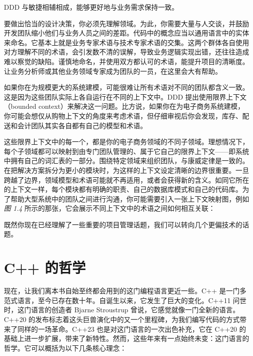 DDD 与敏捷相辅相成，能够更好地与业务需求保持一致。

要做出恰当的设计决策，你必须先理解领域。为此，你需要大量与人交谈，并鼓励开发团队缩小他们与业务人员之间的差距。代码中的概念应当以通用语言中的实体来命名。它基本上就是业务专家术语与技术专家术语的交集。这两个群体各自使用对方理解不同的术语，会引发数不清的误解，导致业务逻辑实现出错，还往往造成难以察觉的缺陷。谨慎地命名，并使用双方都认可的术语，能提升项目的清晰度。让业务分析师或其他业务领域专家成为团队的一员，在这里会大有帮助。

如果你在为规模更大的系统建模，可能很难让所有术语对不同的团队都含义一致。这是因为这些团队实际上各自运行在不同的上下文中。DDD 提出使用限界上下文（bounded context）来解决这一问题。比方说，如果你在为电子商务系统建模，你可能会想仅从购物上下文的角度来考虑术语，但仔细审视后你会发现，库存、配送和会计团队其实各自都有自己的模型和术语。

\label{idx:024}
\label{idx:025}
这些限界上下文中的每一个，都是你的电子商务领域的不同子领域。理想情况下，每个子领域都可以映射到由专门团队管理的、属于它自己的限界上下文——即系统中拥有自己的词汇表的一部分。围绕特定领域来组织团队，与康威定律是一致的。在把解决方案拆分为更小的模块时，为这样的上下文设定清晰的边界很重要。一旦跨越了边界，领域模型和术语可能就不再适用，或者会获得新的含义。如同它所在的上下文一样，每个模块都有明确的职责、自己的数据库模式和自己的代码库。为了帮助大型系统中的团队之间进行沟通，你可能需要引入一张上下文映射图，例如 \emph{图 1.4} 所示的那张，它会展示不同上下文中的术语之间如何相互关联：


\label{idx:026}
\label{idx:027}
既然你现在已经理解了一些重要的项目管理话题，我们可以转向几个更偏技术的话题。

\section{C++ 的哲学}

\label{idx:028}
现在，让我们离本书自始至终都会用到的这门编程语言更近一些。C++ 是一门多范式语言，至今已存在数十年。自诞生以来，它发生了巨大的变化。C++11 问世时，这门语言的创造者 Bjarne Stroustrup 曾说，它感觉就像一门全新的语言。C++20 的发布标志着这头巨兽演化中的又一个里程碑，为我们编写代码的方式带来了同样的一场革命。C++23 也是对这门语言的一次出色补充，它在 C++20 的基础上进一步扩展，带来了新特性。然而，这些年来有一点始终未变：这门语言的哲学。它可以概括为以下几条核心理念：

